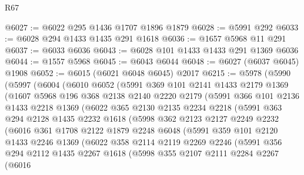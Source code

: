 \begin{lexlean}{R67}
\begin{coremodule}
@6027 := @6022 @295 @1436 @1707 @1896 @1879
@6028 := @5991 @292
@6033 := @6028 @294 @1433 @1435 @291 @1618
@6036 := @1657 @5968 @11 @291
@6037 := @6033 @6036
@6043 := @6028 @101 @1433 @1433 @291 @1369 @6036
@6044 := @1557 @5968
@6045 := @6043 @6044
@6048 := @6027 (@6037 @6045) @1908
@6052 := @6015 (@6021 @6048 @6045) @2017
@6215 := @5978
    (@5990
      (@5997
        (@6004
          (@6010
            @6052
            (@5991
              @369
              @101
              @2141
              @1433
              @2179
              @1369
              (@1607
                @5968
                @196
                @368
                @2138
                @2140
                @2220
                @2179
                (@5991
                  @366
                  @101
                  @2136
                  @1433
                  @2218
                  @1369
                  (@6022
                    @365
                    @2130
                    @2135
                    @2234
                    @2218
                    (@5991
                      @363
                      @294
                      @2128
                      @1435
                      @2232
                      @1618
                      (@5998
                        @362
                        @2123
                        @2127
                        @2249
                        @2232
                        (@6016
                          @361
                          @1708
                          @2122
                          @1879
                          @2248
                          @6048
                          (@5991
                            @359
                            @101
                            @2120
                            @1433
                            @2246
                            @1369
                            (@6022
                              @358
                              @2114
                              @2119
                              @2269
                              @2246
                              (@5991
                                @356
                                @294
                                @2112
                                @1435
                                @2267
                                @1618
                                (@5998
                                  @355
                                  @2107
                                  @2111
                                  @2284
                                  @2267
                                  (@6016

\end{coremodule}
\end{lexlean}
